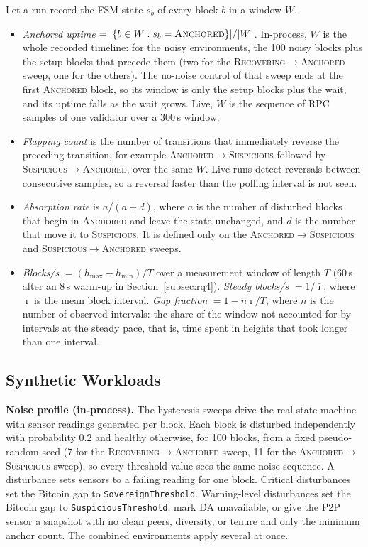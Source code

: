 Let a run record the FSM state $s_b$ of every block $b$ in a window $W$.
\begin{itemize}
  \item \emph{Anchored uptime} $=|\{b\in W : s_b=\textsc{Anchored}\}|/|W|$.
  In-process, $W$ is the whole recorded timeline: for the noisy
  environments, the 100 noisy blocks plus the setup blocks that precede them
  (two for the \textsc{Recovering}$\to$\textsc{Anchored} sweep, one for the
  others). The no-noise control of that sweep ends at the first
  \textsc{Anchored} block, so its window is only the setup blocks plus the
  wait, and its uptime falls as the wait grows. Live, $W$ is the sequence of
  RPC samples of one validator over a 300\,s window.
  \item \emph{Flapping count} is the number of transitions that immediately
  reverse the preceding transition, for example
  \textsc{Anchored}$\to$\textsc{Suspicious} followed by
  \textsc{Suspicious}$\to$\textsc{Anchored}, over the same $W$. Live runs
  detect reversals between consecutive samples, so a reversal faster than
  the polling interval is not seen.
  \item \emph{Absorption rate} is $a/(a+d)$, where $a$ is the number of
  disturbed blocks that begin in \textsc{Anchored} and leave the state
  unchanged, and $d$ is the number that move it to \textsc{Suspicious}.
  It is defined only on the \textsc{Anchored}$\to$\textsc{Suspicious} and
  \textsc{Suspicious}$\to$\textsc{Anchored} sweeps.
  \item \emph{Blocks/s} $=(h_{\max}-h_{\min})/T$ over a measurement window of
  length $T$ (60\,s after an 8\,s warm-up in Section~\ref{subsec:rq4}).
  \emph{Steady blocks/s} $=1/\bar\imath$, where $\bar\imath$ is the mean
  block interval. \emph{Gap fraction} $=1-n\bar\imath/T$, where $n$ is the
  number of observed intervals: the share of the window not accounted for
  by intervals at the steady pace, that is, time spent in heights that took
  longer than one interval.
\end{itemize}

\subsection{Synthetic Workloads}
\label{subsec:montecarlo}

\textbf{Noise profile (in-process).} The hysteresis sweeps drive the real
state machine with sensor readings generated per block. Each block is
disturbed independently with probability 0.2 and healthy otherwise, for 100
blocks, from a fixed pseudo-random seed (7 for the
\textsc{Recovering}$\to$\textsc{Anchored} sweep, 11 for the
\textsc{Anchored}$\to$\textsc{Suspicious} sweep), so every threshold value
sees the same noise sequence. A disturbance sets sensors to a failing
reading for one block. Critical disturbances set the Bitcoin gap to
\texttt{SovereignThreshold}. Warning-level disturbances set the Bitcoin gap
to \texttt{SuspiciousThreshold}, mark DA unavailable, or give the P2P sensor
a snapshot with no clean peers, diversity, or tenure and only the minimum
anchor count. The combined environments apply several at once.


